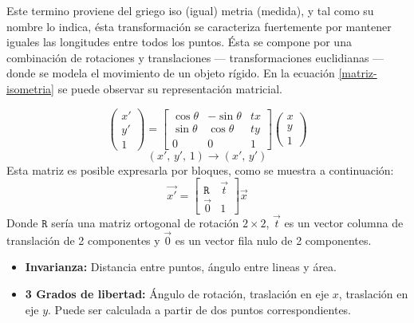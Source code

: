 Este termino proviene del griego iso (igual) metria (medida), y tal como su nombre lo indica, ésta transformación se caracteriza fuertemente por mantener iguales las longitudes entre todos los puntos. Ésta se compone por una combinación de rotaciones y translaciones --- transformaciones euclidianas --- donde se modela el movimiento de un objeto rígido. En la ecuación \ref{matriz-isometria} se puede observar su representación matricial.

\begin{equation}
	\begin{pmatrix}
	{x'}\\{y'}\\{1}
	\end{pmatrix} = 
	\begin{bmatrix}
	{\cos \theta}&{-\sin \theta}&{tx}\\
	{\sin \theta}&{\cos \theta}&{ty}\\
	{0}&{0}&{1}
	\end{bmatrix}
	\begin{pmatrix}
	{x}\\{y}\\{1}
	\end{pmatrix}
	\label{matriz-isometria}
\end{equation}
\begin{displaymath}
(x', \,y', \,1) \to (x',\, y') 
\end{displaymath}
Esta matriz es posible expresarla por bloques, como se muestra a continuación:
\begin{displaymath}
\vec{x'}= 
\begin{bmatrix}
{\mathtt{R}}&{\vec{t}}\\
{\vec{0}}&{1}
\end{bmatrix}
\vec{x}
\label{bloque-isometria}
\end{displaymath}
Donde $ \mathtt{R} $ sería una matriz ortogonal de rotación $2\times2$, $ \vec{t} $ es un vector columna de translación de 2 componentes y $\vec{0} $ es un vector fila nulo de 2 componentes.
\begin{itemize}
	\item \textbf{Invarianza:} Distancia entre puntos, ángulo entre lineas y área.
	\item \textbf{3 Grados de libertad:} Ángulo de rotación, traslación en eje $x$, traslación en eje $y$. Puede ser calculada a partir de dos puntos correspondientes.
\end{itemize}

